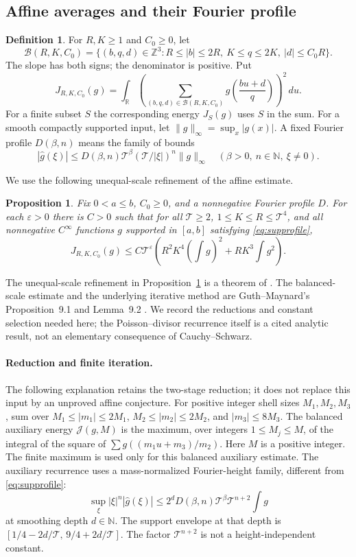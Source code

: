 \documentclass[11pt,a4paper,oneside]{article}
\newtheorem{proposition}[theorem]{Proposition}
\theoremstyle{definition}
\newtheorem{definition}[theorem]{Definition}
\newcommand{\R}{\mathbb R}
\newcommand{\N}{\mathbb N}
\newcommand{\Z}{\mathbb Z}
\newcommand{\eps}{\varepsilon}
\newcommand{\Hhat}{\widehat}
\numberwithin{equation}{section}
\begin{document}
\subsection{Affine averages and their Fourier profile}
\begin{definition}
For $R,K\ge1$ and $C_0\ge0$, let
\[
 \mathcal B(R,K,C_0)=\{(b,q,d)\in\Z^3:
 R\le|b|\le2R,\ K\le q\le2K,\ |d|\le C_0R\}.
\]
The slope has both signs; the denominator is positive. Put
\[
 J_{R,K,C_0}(g)=\int_\R
 \left(\sum_{(b,q,d)\in\mathcal B(R,K,C_0)}
                  g\left(\frac{bu+d}{q}\right)\right)^2\,du.
\]
For a finite subset $S$ the corresponding energy $J_S(g)$ uses $S$ in the sum.
For a smooth compactly supported input, let
$\|g\|_\infty=\sup_x|g(x)|$.
A fixed Fourier profile $D(\beta,n)$ means the family of bounds
\begin{equation}\label{eq:supprofile}
 |\Hhat g(\xi)|\le D(\beta,n)\mathcal T^\beta
       (\mathcal T/|\xi|)^n\|g\|_\infty
 \quad(\beta>0,\ n\in\N,\ \xi\ne0).
\end{equation}
\end{definition}
We use the following unequal-scale refinement of the affine estimate.
\begin{proposition}\label{input:affine}
Fix $0<a\le b$, $C_0\ge0$, and a nonnegative Fourier profile $D$.
For each $\eps>0$ there is $C>0$ such that for all
$\mathcal T\ge2$, $1\le K\le R\le\mathcal T^4$, and all nonnegative
$C^\infty$ functions $g$ supported in $[a,b]$ satisfying
\eqref{eq:supprofile},
\begin{equation*}
 J_{R,K,C_0}(g)\le C\mathcal T^\eps
 \left(R^2K^4\left(\int g\right)^2+RK^3\int g^2\right).
\end{equation*}

\end{proposition}
The unequal-scale refinement in Proposition~\ref{input:affine} is a theorem of \cite{Lewko}. The balanced-scale estimate and the underlying iterative method are Guth--Maynard's Proposition~9.1 and Lemma~9.2 \cite{GuthMaynard}. We record the reductions and constant selection needed here; the Poisson--divisor recurrence itself is a cited analytic result, not an elementary consequence of Cauchy--Schwarz.
\paragraph{Reduction and finite iteration.}
The following explanation retains the two-stage reduction; it does not
replace this input by an unproved affine conjecture. For positive integer shell sizes $M_1,M_2,M_3$, sum over $M_1\le|m_1|\le2M_1$, $M_2\le|m_2|\le2M_2$, and $|m_3|\le8M_3$. The balanced auxiliary energy $\mathcal J(g,M)$ is the maximum, over integers $1\le M_j\le M$, of the integral of the square of $\sum g((m_1u+m_3)/m_2)$. Here $M$ is a positive integer. The finite maximum is used only for this balanced auxiliary estimate.
The auxiliary recurrence uses a mass-normalized Fourier-height family, different from \eqref{eq:supprofile}:
\[
 \sup_\xi |\xi|^n|\Hhat g(\xi)|
 \le 2^dD(\beta,n)\mathcal T^\beta\mathcal T^{n+2}\int g
\]
at smoothing depth $d\in\N$. The support envelope at that depth is
$[1/4-2d/\mathcal T,\,9/4+2d/\mathcal T]$.
The factor $\mathcal T^{n+2}$ is not a height-independent constant.
\end{document}
